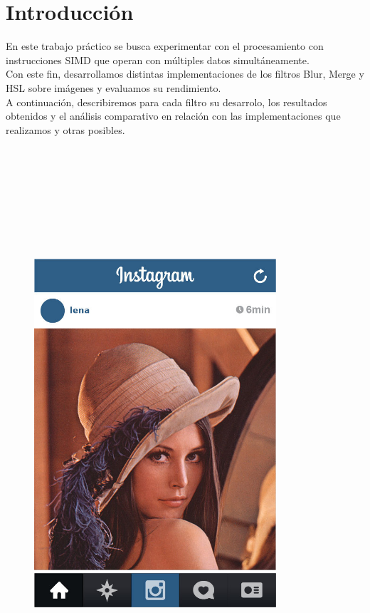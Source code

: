 \section{Introducción}
En este trabajo práctico se busca experimentar con el procesamiento con instrucciones SIMD que operan con múltiples datos simultáneamente.\\ 
Con este fin, desarrollamos distintas implementaciones de los filtros Blur, Merge y HSL sobre imágenes y evaluamos su rendimiento.\\
A continuación, describiremos para cada filtro su desarrolo, los resultados obtenidos y el análisis comparativo en relación con las implementaciones que realizamos y otras posibles.\\\\\\\\\\\\\\\\\\

\begin{figure}[ht]
\centering
\includegraphics[width=90mm]{introduccion/lena_instagram.jpg}
\end{figure}
